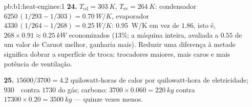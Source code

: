 \begin{solution}{pb:b1:heat-engines:1}
\textbf{24.} $T_{\mathrm{cd}} = \qty{303}{K}$, $T_{\mathrm{ev}} = \qty{264}{K}$:
condensador $6250\,(1/293 - 1/303) = \qty{0.70}{W/K}$, evaporador
$4330\,(1/264 - 1/268) = \qty{0.25}{W/K}$: \qty{0.95}{W/K} em vez de
$1.86$, isto é, $268 \times 0.91 \approx \qty{0.25}{kW}$ economizados ($13\%$; a
máquina inteira, avaliada a $0.55$ de um valor de Carnot melhor, ganharia
mais). Reduzir uma diferença à metade significa dobrar a superfície de troca:
trocadores maiores, mais caros e mais potência de ventilação.

\textbf{25.} $15600/3700 = 4.2$ quilowatt-horas de calor por quilowatt-hora
de eletricidade; $930$~\texteuro\ contra $1730$ do gás; carbono: $3700
\times 0.060 = \qty{220}{kg}$ contra $17300 \times 0.20 = \qty{3500}{kg}$ ---
quinze vezes menos.
\end{solution}
